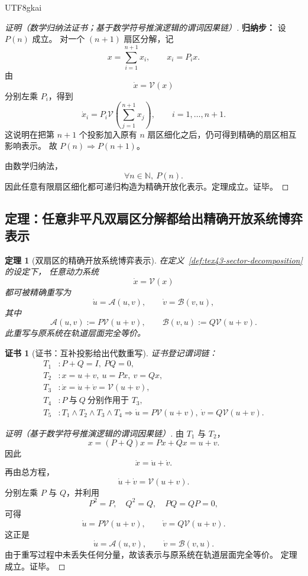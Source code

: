\documentclass[12pt]{article}
\newtheorem{theorem}{定理}[section]
\newtheorem{Certificate}{证书}[section]
\newcommand{\NN}{\mathbb{N}}
\begin{document}
\begin{CJK*}{UTF8}{gkai}
\begin{proof}[证明（数学归纳法证书；基于数学符号推演逻辑的谓词因果链）]
\textbf{归纳步：}
设 $P(n)$ 成立。
对一个 $(n+1)$ 扇区分解，记
\[
  x=\sum_{i=1}^{n+1}x_i,
  \qquad
  x_i=P_i x.
\]
由
\[
  \dot x=\mathcal V(x)
\]
分别左乘 $P_i$，得到
\[
  \dot x_i
  =
  P_i\mathcal V\!\left(\sum_{j=1}^{n+1}x_j\right),
  \qquad
  i=1,\dots,n+1.
\]
这说明在把第 $n+1$ 个投影加入原有 $n$ 扇区细化之后，仍可得到精确的扇区相互影响表示。
故 $P(n)\Rightarrow P(n+1)$。

由数学归纳法，
\[
  \forall n\in\NN,\ P(n).
\]
因此任意有限扇区细化都可递归构造为精确开放化表示。定理成立。证毕。
\end{proof}

\subsection{定理：任意非平凡双扇区分解都给出精确开放系统博弈表示}
\label{subsec:tex43-ch3-theorem-openization}

\begin{theorem}[双扇区的精确开放系统博弈表示]
\label{thm:tex43-two-sector-openization}
在定义~\ref{def:tex43-sector-decomposition} 的设定下，
任意动力系统
\[
  \dot x=\mathcal V(x)
\]
都可被精确重写为
\[
  \dot u=\mathcal A(u,v),
  \qquad
  \dot v=\mathcal B(v,u),
\]
其中
\[
  \mathcal A(u,v):=P\mathcal V(u+v),
  \qquad
  \mathcal B(v,u):=Q\mathcal V(u+v).
\]
此重写与原系统在轨道层面完全等价。
\end{theorem}

\begin{Certificate}[证书：互补投影给出代数重写]
\label{cert:tex43-two-sector-openization}
证书登记谓词链：
\[
\begin{aligned}
  T_1 &: P+Q=I,\ PQ=0,\\
  T_2 &: x=u+v,\ u=Px,\ v=Qx,\\
  T_3 &: \dot x=\dot u+\dot v=\mathcal V(u+v),\\
  T_4 &: P\ \text{与}\ Q\ \text{分别作用于 }T_3,\\
  T_5 &: T_1\wedge T_2\wedge T_3\wedge T_4 \Rightarrow \dot u=P\mathcal V(u+v),\ \dot v=Q\mathcal V(u+v).
\end{aligned}
\]
\end{Certificate}

\begin{proof}[证明（基于数学符号推演逻辑的谓词因果链）]
由 $T_1$ 与 $T_2$，
\[
  x=(P+Q)x=Px+Qx=u+v.
\]
因此
\[
  \dot x=\dot u+\dot v.
\]
再由总方程，
\[
  \dot u+\dot v=\mathcal V(u+v).
\]
分别左乘 $P$ 与 $Q$，并利用
\[
  P^2=P,\quad Q^2=Q,\quad PQ=QP=0,
\]
可得
\[
  \dot u=P\mathcal V(u+v),
  \qquad
  \dot v=Q\mathcal V(u+v).
\]
这正是
\[
  \dot u=\mathcal A(u,v),
  \qquad
  \dot v=\mathcal B(v,u).
\]
由于重写过程中未丢失任何分量，故该表示与原系统在轨道层面完全等价。
定理成立。证毕。
\end{proof}


\end{CJK*}
\end{document}
